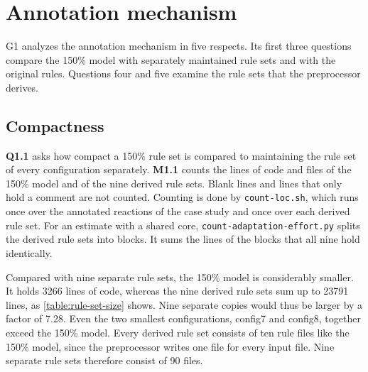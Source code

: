 \section{Annotation mechanism}
\label{sec:Evaluation:AnnotationMechanism}

G1 analyzes the annotation mechanism in five respects.
Its first three questions compare the 150\% model with separately maintained rule sets and with the original rules.
Questions four and five examine the rule sets that the preprocessor derives.

\subsection{Compactness}
\label{sec:Evaluation:AnnotationMechanism:Compactness}

\textbf{Q1.1} asks how compact a 150\% rule set is compared to maintaining the rule set of every configuration separately.
\textbf{M1.1} counts the lines of code and files of the 150\% model and of the nine derived rule sets.
Blank lines and lines that only hold a comment are not counted.
Counting is done by \texttt{count-loc.sh}, which runs once over the annotated reactions of the case study and once over each derived rule set.
For an estimate with a shared core, \texttt{count-adaptation-effort.py} splits the derived rule sets into blocks.
It sums the lines of the blocks that all nine hold identically.

Compared with nine separate rule sets, the 150\% model is considerably smaller.
It holds 3266 lines of code, whereas the nine derived rule sets sum up to 23791 lines, as \autoref{table:rule-set-size} shows.
Nine separate copies would thus be larger by a factor of 7.28.
Even the two smallest configurations, config7 and config8, together exceed the 150\% model.
Every derived rule set consists of ten rule files like the 150\% model, since the preprocessor writes one file for every input file.
Nine separate rule sets therefore consist of 90 files.

